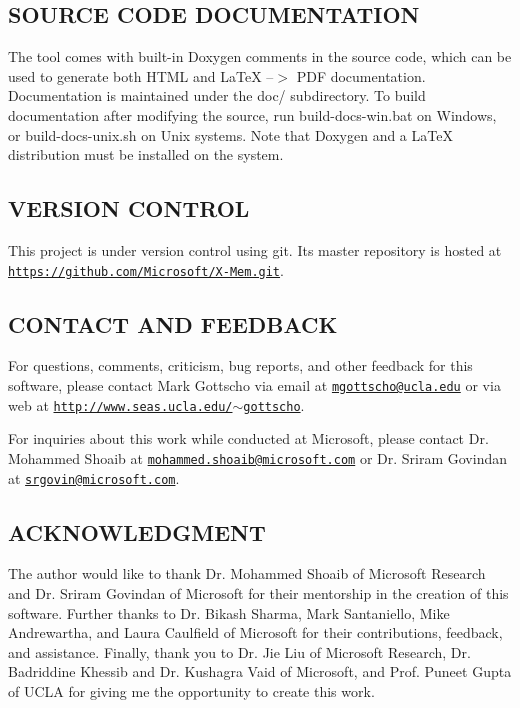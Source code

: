  \subsection*{S\+O\+U\+R\+C\+E C\+O\+D\+E D\+O\+C\+U\+M\+E\+N\+T\+A\+T\+I\+O\+N }

The tool comes with built-\/in Doxygen comments in the source code, which can be used to generate both H\+T\+M\+L and La\+Te\+X --$>$ P\+D\+F documentation. Documentation is maintained under the doc/ subdirectory. To build documentation after modifying the source, run build-\/docs-\/win.\+bat on Windows, or build-\/docs-\/unix.\+sh on Unix systems. Note that Doxygen and a La\+Te\+X distribution must be installed on the system. 

 \subsection*{V\+E\+R\+S\+I\+O\+N C\+O\+N\+T\+R\+O\+L }

This project is under version control using git. Its master repository is hosted at \href{https://github.com/Microsoft/X-Mem.git}{\tt https\+://github.\+com/\+Microsoft/\+X-\/\+Mem.\+git}. 

 \subsection*{C\+O\+N\+T\+A\+C\+T A\+N\+D F\+E\+E\+D\+B\+A\+C\+K }

For questions, comments, criticism, bug reports, and other feedback for this software, please contact Mark Gottscho via email at \href{mailto:mgottscho@ucla.edu}{\tt mgottscho@ucla.\+edu} or via web at \href{http://www.seas.ucla.edu/~gottscho}{\tt http\+://www.\+seas.\+ucla.\+edu/$\sim$gottscho}.

For inquiries about this work while conducted at Microsoft, please contact Dr. Mohammed Shoaib at \href{mailto:mohammed.shoaib@microsoft.com}{\tt mohammed.\+shoaib@microsoft.\+com} or Dr. Sriram Govindan at \href{mailto:srgovin@microsoft.com}{\tt srgovin@microsoft.\+com}. 

 \subsection*{A\+C\+K\+N\+O\+W\+L\+E\+D\+G\+M\+E\+N\+T }

The author would like to thank Dr. Mohammed Shoaib of Microsoft Research and Dr. Sriram Govindan of Microsoft for their mentorship in the creation of this software. Further thanks to Dr. Bikash Sharma, Mark Santaniello, Mike Andrewartha, and Laura Caulfield of Microsoft for their contributions, feedback, and assistance. Finally, thank you to Dr. Jie Liu of Microsoft Research, Dr. Badriddine Khessib and Dr. Kushagra Vaid of Microsoft, and Prof. Puneet Gupta of U\+C\+L\+A for giving me the opportunity to create this work. 
